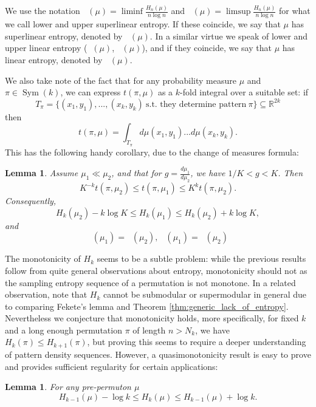 \documentclass[11pt]{article}
\newcommand{\Sym}{\mathop{\mathrm{Sym}}}
\newcommand{\uppersupent}{\mathop{\overline{H}^{\mathrm{superlin}}}}
\newcommand{\lowersupent}{\mathop{\underline{H}^{\mathrm{superlin}}}}
\newcommand{\supent}{\mathop{H^{\mathrm{superlin}}}}
\newcommand{\upperlinent}{\mathop{\overline{H}^{\mathrm{lin}}}}
\newcommand{\lowerlinent}{\mathop{\underline{H}^{\mathrm{lin}}}}
\newcommand{\linent}{\mathop{H^{\mathrm{lin}}}}
\newtheorem{lemma}[theorem]{Lemma}
\theoremstyle{definition}
\begin{document}
We use the notation $\lowersupent(\mu) = \liminf \frac{H_n(\mu)}{n\log n}$ and $\uppersupent(\mu) = \limsup \frac{H_n(\mu)}{n\log n}$ for what we call lower and upper superlinear entropy. If these coincide, we say that $\mu$ has superlinear entropy, denoted by $\supent(\mu)$. In a similar virtue we speak of lower and upper linear entropy ($\lowerlinent(\mu)$, $\upperlinent(\mu)$), and if they coincide, we say that $\mu$ has linear entropy, denoted by $\linent(\mu)$. 

We also take note of the fact that for any probability measure $\mu$ and $\pi\in\Sym(k)$, we can express $t(\pi, \mu)$ as a $k$-fold integral over a suitable set: if
$$T_{\pi} = \{(x_1, y_1), ..., (x_k, y_k)\ \text{s.t. they determine pattern}\ \pi\}\subseteq \mathbb{R}^{2k}$$
then
$$t(\pi, \mu)=\int_{T_{\pi}}d\mu(x_1, y_1)...d\mu(x_k, y_k).$$
This has the following handy corollary, due to the change of measures formula:

\begin{lemma} \label{lemma:abs_cont_bound}
    Assume $\mu_1 \ll \mu_2$, and that for $g=\frac{d\mu_1}{d\mu_2}$, we have $1/K<g<K$. Then
    $$K^{-k} t(\pi, \mu_2) \leq t(\pi, \mu_1) \leq K^k t(\pi, \mu_2).$$
    Consequently,
    $$H_k(\mu_2) -  k \log K \leq H_k(\mu_1) \leq H_k(\mu_2) + k \log K,$$
    and
    $$\lowersupent(\mu_1)=\lowersupent(\mu_2), \ \uppersupent(\mu_1)=\uppersupent(\mu_2)$$
\end{lemma}

The monotonicity of $H_k$ seems to be a subtle problem: while the previous results follow from quite general observations about entropy, monotonicity should not as the sampling entropy sequence of a permutation is not monotone. In a related observation, note that $H_k$ cannot be submodular or supermodular in general due to comparing Fekete's lemma and Theorem \ref{thm:generic_lack_of_entropy}. Nevertheless we conjecture that monotonicity holds, more specifically, for fixed $k$ and a long enough permutation $\pi$ of length $n>N_k$, we have $H_k(\pi)\leq H_{k+1}(\pi)$, but proving this seems to require a deeper understanding of pattern density sequences. However, a quasimonotonicity result is easy to prove and provides sufficient regularity for certain applications:

\begin{lemma} \label{lemma:entropy_quasi_mon}
For any pre-permuton $\mu$
    $$H_{k-1}(\mu)-\log k \leq H_k(\mu) \leq H_{k-1}(\mu)+\log k.$$
\end{lemma}
\end{document}
